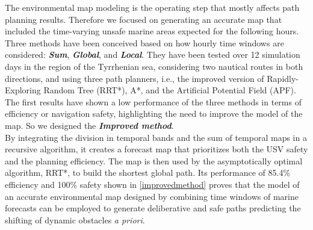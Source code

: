 The environmental map modeling is the operating step that mostly affects path planning results. Therefore we focused on generating an accurate map that included the time-varying unsafe marine areas expected for the following hours. 
Three methods have been conceived based on how hourly time windows are considered: \textbf{\textit{Sum}}, \textbf{\textit{Global}}, and \textbf{\textit{Local}}. They have been tested over 12 simulation days in the region of the Tyrrhenian sea, considering two nautical routes in both directions, and using three path planners, i.e., the improved version of Rapidly-Exploring Random Tree (RRT*), A*, and the Artificial Potential Field (APF).
The first results have shown a low performance of the three methods in terms of efficiency or navigation safety, highlighting the need to improve the model of the map. So we designed the \textbf{\textit{Improved method}}. \\
By integrating the division in temporal bands and the sum of temporal maps in a recursive algorithm, it creates a forecast map that prioritizes both the USV safety and the planning efficiency. The map is then used by the asymptotically optimal algorithm, RRT*, to build the shortest global path.
Its performance of 85.4\% efficiency and 100\% safety shown in \autoref{improvedmethod} proves that the model of an accurate environmental map designed by combining time windows of marine forecasts can be employed to generate deliberative and safe paths predicting the shifting of dynamic obstacles \textit{a priori}. 
